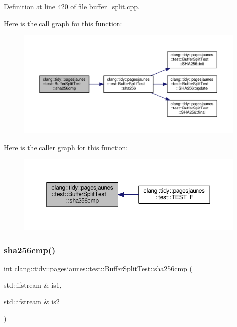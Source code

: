 Definition at line 420 of file buffer\+\_\+split.\+cpp.

Here is the call graph for this function\+:
\nopagebreak
\begin{figure}[H]
\begin{center}
\leavevmode
\includegraphics[width=350pt]{classclang_1_1tidy_1_1pagesjaunes_1_1test_1_1_buffer_split_test_a612d7a65fbe19e0f35c51eb6a68832ae_cgraph}
\end{center}
\end{figure}
Here is the caller graph for this function\+:
\nopagebreak
\begin{figure}[H]
\begin{center}
\leavevmode
\includegraphics[width=350pt]{classclang_1_1tidy_1_1pagesjaunes_1_1test_1_1_buffer_split_test_a612d7a65fbe19e0f35c51eb6a68832ae_icgraph}
\end{center}
\end{figure}
\mbox{\label{classclang_1_1tidy_1_1pagesjaunes_1_1test_1_1_buffer_split_test_abef0f37ba555b9c4829350bf7b7164c5}} 
\subsubsection{\texorpdfstring{sha256cmp()}{sha256cmp()}\hspace{0.1cm}{\footnotesize\ttfamily [2/2]}}
{\footnotesize\ttfamily int clang\+::tidy\+::pagesjaunes\+::test\+::\+Buffer\+Split\+Test\+::sha256cmp (\begin{DoxyParamCaption}\item[{std\+::ifstream \&}]{is1,  }\item[{std\+::ifstream \&}]{is2 }\end{DoxyParamCaption})}



